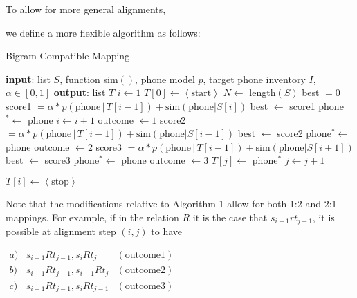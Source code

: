 To allow for more general alignments, 
\iffalse
we define a mapping $r_1$ similarly to $f_1$, the key difference being that 
1-to-2 alignments are possible in both directions.
$$f_2(s^{(n)}_i) = t^{(n)}_k = \arg \max_{t_l \in T} \left[ 
  \alpha \cdot p(t_l|t_{l-1}) + 
\max_{t_l} \left\{ \textrm{sim}(t_l, s^{(n)}_i), \textrm{sim}(t_l, s^{(n)}_{i-1}) \right\}
\right].$$
\fi
we define a more flexible algorithm as follows:
\begin{algorithm}[H]
  \caption{Bigram-Compatible Mapping}
    \begin{algorithmic}
    \State \textbf{input}: list $S$, function sim$()$, phone model $p$, target phone inventory $I$, $\alpha \in [0,1]$
    \State \textbf{output}: list $T$
    \State $i\gets 1$
    \State $T[0] \gets \left<\textrm{start}\right>$
    \State $N\gets $ length$(S)$
        \State best $= 0$
          \State score1 $=\alpha * p(\textrm{phone}\,|\,T[i-1]) + \textrm{sim}(\textrm{phone}|S[i])$ %
            \State best $\gets$ score1
            \State phone$^* \gets$ phone
            \State $i \gets i+1$
            \State outcome $\gets 1$
          \EndIf
          \State score2 $=\alpha * p(\textrm{phone}\,|\,T[i-1]) + \textrm{sim}(\textrm{phone}|S[i-1])$ %
            \State best $\gets$ score2
            \State phone$^* \gets$ phone
            \State outcome $\gets 2$
          \EndIf
          \State score3 $=\alpha * p(\textrm{phone}\,|\,T[i-1]) + \textrm{sim}(\textrm{phone}|S[i+1])$ %
            \State best $\gets$ score3
            \State phone$^* \gets$ phone
            \State outcome $\gets 3$
          \EndIf
        \EndFor
          \State $T[j] \gets $ phone$^*$
          \State $j\gets j+1$
          
        \EndIf
    \EndWhile
    \State $T[i] \gets \left<\textrm{stop}\right>$
  \end{algorithmic}
  \end{algorithm}
Note that the modifications relative to Algorithm 1 allow for both 1:2 and 2:1 mappings. For example, if 
in the relation $R$ it is the case that $s_{i-1} r t_{j-1}$, it is possible at alignment step $(i, j)$ 
to have 

$\begin{array}{lll}
  a) & s_{i-1} R t_{j-1}, s_i R t_j & (\textrm{outcome} 1) \\
  b) & s_{i-1} R t_{j-1}, s_{i-1} R t_j & (\textrm{outcome} 2) \\
  c) & s_{i-1} R t_{j-1}, s_i R t_{j-1} & (\textrm{outcome} 3)
\end{array}$

